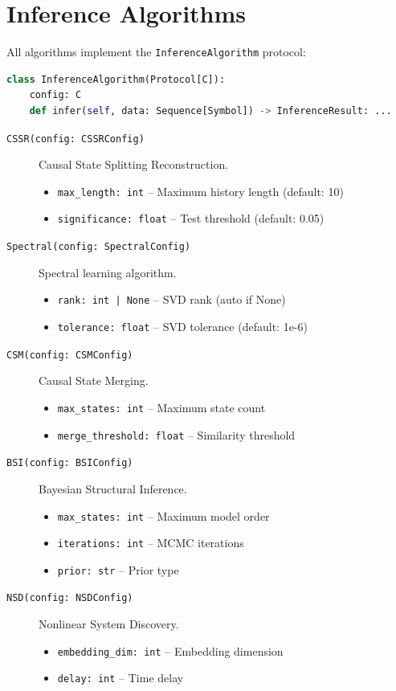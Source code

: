 \documentclass[11pt,a4paper]{report}
\theoremstyle{definition}
\theoremstyle{plain}
\begin{document}
\section{Inference Algorithms}

All algorithms implement the \texttt{InferenceAlgorithm} protocol:

\begin{lstlisting}[language=Python]
class InferenceAlgorithm(Protocol[C]):
    config: C
    def infer(self, data: Sequence[Symbol]) -> InferenceResult: ...
\end{lstlisting}

\begin{description}
    \item[\texttt{CSSR(config: CSSRConfig)}] Causal State Splitting Reconstruction.
        \begin{itemize}
            \item \texttt{max\_length: int} -- Maximum history length (default: 10)
            \item \texttt{significance: float} -- Test threshold (default: 0.05)
        \end{itemize}

    \item[\texttt{Spectral(config: SpectralConfig)}] Spectral learning algorithm.
        \begin{itemize}
            \item \texttt{rank: int | None} -- SVD rank (auto if None)
            \item \texttt{tolerance: float} -- SVD tolerance (default: 1e-6)
        \end{itemize}

    \item[\texttt{CSM(config: CSMConfig)}] Causal State Merging.
        \begin{itemize}
            \item \texttt{max\_states: int} -- Maximum state count
            \item \texttt{merge\_threshold: float} -- Similarity threshold
        \end{itemize}

    \item[\texttt{BSI(config: BSIConfig)}] Bayesian Structural Inference.
        \begin{itemize}
            \item \texttt{max\_states: int} -- Maximum model order
            \item \texttt{iterations: int} -- MCMC iterations
            \item \texttt{prior: str} -- Prior type
        \end{itemize}

    \item[\texttt{NSD(config: NSDConfig)}] Nonlinear System Discovery.
        \begin{itemize}
            \item \texttt{embedding\_dim: int} -- Embedding dimension
            \item \texttt{delay: int} -- Time delay
        \end{itemize}
\end{description}
\end{document}
